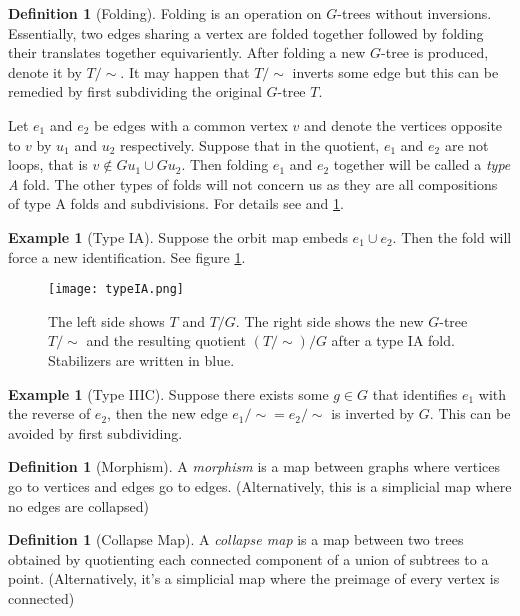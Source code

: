 \documentclass[12pt,parskip=full]{report}
\theoremstyle{plain}
\theoremstyle{definition}
\newtheorem{dfn}[thm]{Definition}
\newtheorem{exa}[thm]{Example}
\begin{document}
\begin{dfn}
    [Folding]
    \label{defn:folding}
    Folding is an operation on \(G\)-trees without inversions. Essentially, two edges sharing a vertex are folded together followed by folding their translates together equivariently. After folding a new \(G\)-tree is produced, denote it by \(T/{\sim}\). It may happen that \(T/{\sim}\) inverts some edge but this can be remedied by first subdividing the original \(G\)-tree \(T\).
    
    Let \(e_1\) and \(e_2\) be edges with a common vertex \(v\) and denote the vertices opposite to \(v\) by \(u_1\) and \(u_2\) respectively. Suppose that in the quotient, \(e_1\) and \(e_2\) are not loops, that is \(v\not\in Gu_1\cup Gu_2\). Then folding \(e_1\) and \(e_2\) together will be called a \emph{type A} fold. The other types of folds will not concern us as they are all compositions of type A folds and subdivisions. For details see \cite{boundingcomplexity} and \ref{exa:folding}.
\end{dfn}

\begin{exa}
[Type IA]
\label{exa:folding}
Suppose the orbit map embeds \(e_1\cup e_2\). Then the fold will force a new identification. See figure \ref{fig:typeIA}.
\begin{figure}[!h]
    \label{fig:typeIA}
    \centering
    \texttt{[image: typeIA.png]}
    \caption{The left side shows \(T\) and \(T/G\). The right side shows the new \(G\)-tree \(T/{\sim}\) and the resulting quotient \( (T/{\sim})/G\) after a type IA fold. Stabilizers are written in blue.}
\end{figure}
\end{exa}

\begin{exa}
[Type IIIC]
\label{exa:folding2}
Suppose there exists some \(g\in G\) that identifies \(e_1\) with the reverse of \(e_2\), then the new edge \(e_1/{\sim} =  e_2/{\sim} \) is inverted by \(G\).  This can be avoided by first subdividing.
\end{exa}

\newpage
\begin{dfn}
    [Morphism]
    A \emph{morphism} is a map between graphs where vertices go to vertices and edges go to edges. (Alternatively, this is a simplicial map where no edges are collapsed)
\end{dfn}

\begin{dfn}
    [Collapse Map]
    A \emph{collapse map} is a map between two trees obtained by quotienting each connected component of a union of subtrees to a point. (Alternatively, it's a simplicial map where the preimage of every vertex is connected)
\end{dfn}
\end{document}
